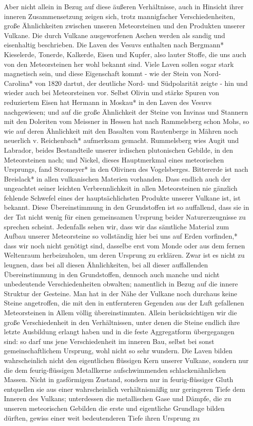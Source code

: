 \documentclass[a4paper, 8pt, oneside, polutonikogreek, german]{article}
\begin{document}
Aber nicht allein in Bezug auf diese äußeren Verhältnisse, auch in Hinsicht ihrer inneren Zusammensetzung zeigen sich, trotz mannigfacher Verschiedenheiten, große Ähnlichkeiten zwischen unseren Meteorsteinen und den Produkten unserer Vulkane. Die durch Vulkane ausgeworfenen Aschen werden als sandig und eisenhaltig beschrieben. Die Laven des Vesuvs enthalten nach Bergmann* Kieselerde, Tonerde, Kalkerde, Eisen und Kupfer, also lauter Stoffe, die uns auch von den Meteorsteinen her wohl bekannt sind. Viele Laven sollen sogar stark magnetisch sein, und diese Eigenschaft kommt - wie der Stein von Nord-Carolina* von 1820 dartut, der deutliche Nord- und Südpolarität zeigte - hin und wieder auch bei Meteorsteinen vor. Selbst Olivin und stärke Spuren von reduziertem Eisen hat Hermann in Moskau* in den Laven des Vesuvs nachgewiesen; und auf die große Ähnlichkeit der Steine von Invinas und Stannern mit den Doleriten vom Meissner in Hessen hat nach Rammelsberg schon Mohs, so wie auf deren Ähnlichkeit mit den Basalten vom Rautenberge in Mähren noch neuerlich v. Reichenbach* aufmerksam gemacht. Rummelsberg wies Augit und Labrador, beides Bestandteile unserer irdischen plutonischen Gebilde, in den Meteorsteinen nach; und Nickel, dieses Hauptmerkmal eines meteorischen Ursprungs, fand Stromeyer* in den Olivinen des Vogelsberges. Bittererde ist nach Breislack* in allen vulkanischen Materien vorhanden. Dass endlich auch der ungeachtet seiner leichten Verbrennlichkeit in allen Meteorsteinen nie gänzlich fehlende Schwefel eines der hauptsächlichsten Produkte unserer Vulkane ist, ist bekannt. Diese Übereinstimmung in den Grundstoffen ist so auffallend, dass sie in der Tat nicht wenig für einen gemeinsamen Ursprung beider Naturerzeugnisse zu sprechen scheint. Jedenfalls sehen wir, dass wir das sämtliche Material zum Aufbau unserer Meteorsteine so vollständig hier bei uns auf Erden vorfinden,* dass wir noch nicht genötigt sind, dasselbe erst vom Monde oder aus dem fernen Weltenraum herbeizuholen, um deren Ursprung zu erklären. Zwar ist es nicht zu leugnen, dass bei all diesen Ähnlichkeiten, bei all dieser auffallenden Übereinstimmung in den Grundstoffen, dennoch auch manche und nicht unbedeutende Verschiedenheiten obwalten; namentlich in Bezug auf die innere Struktur der Gesteine. Man hat in der Nähe der Vulkane noch durchaus keine Steine angetroffen, die mit den in entfernteren Gegenden aus der Luft gefallenen Meteorsteinen in Allem völlig übereinstimmten. Allein berücksichtigen wir die große Verschiedenheit in den Verhältnissen, unter denen die Steine endlich ihre letzte Ausbildung erlangt haben und in die feste Aggregatform übergegangen sind: so darf uns jene Verschiedenheit im inneren Bau, selbst bei sonst gemeinschaftlichem Ursprung, wohl nicht so sehr wundern. Die Laven bilden wahrscheinlich nicht den eigentlichen flüssigen Kern unserer Vulkane, sondern nur die dem feurig-flüssigen Metallkerne aufschwimmenden schlackenähnlichen Massen. Nicht in gasförmigem Zustand, sondern nur in feurig-flüssiger Gluth entquellen sie aus einer wahrscheinlich verhältnismäßig nur geringeren Tiefe dem Inneren des Vulkans; unterdessen die metallischen Gase und Dämpfe, die zu unseren meteorischen Gebilden die erste und eigentliche Grundlage bilden dürften, gewiss einer weit bedeutenderen Tiefe ihren Ursprung zu 
\end{document}
